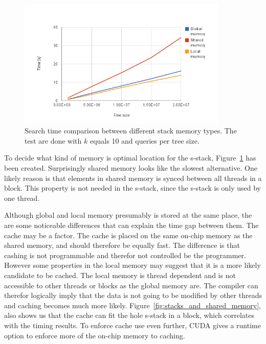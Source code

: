 \begin{figure}[ht!]
    \centering
    \includegraphics[width=100mm]{../gfx/stack_speed.png}

    \caption{Search time comparison between different stack memory types. The test are done with $k$ equals 10 and  queries per tree size. }
    \label{tbl:stack_speed}
\end{figure}

To decide what kind of memory is optimal location for the s-stack, Figure~\ref{tbl:stack_speed} has been created. Surprisingly shared memory looks like the slowest alternative. One likely reason is that elements in shared memory is synced between all threads in a block. This property is not needed in the s-stack, since the s-stack is only used by one thread.

Although global and local memory presumably is stored at the same place, the are some noticeable differences that can explain the time gap between them. The cache may be a factor. The cache is placed on the same on-chip memory as the shared memory, and should therefore be equally fast. The difference is that cashing is not programmable and therefor not controlled be the programmer. However some properties in the local memory may suggest that it is a more likely candidate to be cached. The local memory is thread dependent and is not accessible to other threads or blocks as the global memory are. The compiler can therefor logically imply that the data is not going to be modified by other threads and caching becomes much more likely. Figure~\ref{fig:stacks_and_shared_memory}, also shows us that the cache can fit the hole s-stack in a block, which correlates with the timing results. To enforce cache use even further, CUDA gives a runtime option to enforce more of the on-chip memory to caching.

